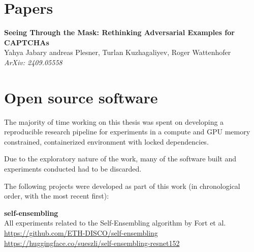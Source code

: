 \documentclass[a4paper, oneside]{discothesis}
\newcommand{\linebreaks}{\vspace*{0.5em}}
\begin{document}

\section*{Papers}


\begin{spacing}{1}
	\textbf{Seeing Through the Mask: Rethinking Adversarial Examples for CAPTCHAs} \\
	Yahya Jabary andreas Plesner, Turlan Kuzhagaliyev, Roger Wattenhofer \\
	\textit{ArXiv: 2409.05558}
\end{spacing}

\section*{Open source software}

The majority of time working on this thesis was spent on developing a reproducible research pipeline for experiments in a compute and GPU memory constrained, containerized environment with locked dependencies.

Due to the exploratory nature of the work, many of the software built and experiments conducted had to be discarded.

The following projects were developed as part of this work (in chronological order, with the most recent first):

\linebreaks

\begin{samepage}
	\begin{spacing}{1}
		\textbf{self-ensembling} \\
		All experiments related to the Self-Ensembling algorithm by Fort et al. \\
		\url{https://github.com/ETH-DISCO/self-ensembling} \\
		\url{https://huggingface.co/sueszli/self-ensembling-resnet152}
	\end{spacing}
\end{samepage}
\end{document}
